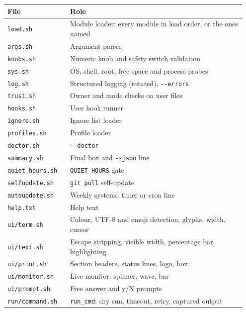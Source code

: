 \documentclass[11pt,a4paper]{article}
\begin{document}
\begin{center}
\begin{longtable}{@{}p{0.25\linewidth} p{0.70\linewidth}@{}}
\toprule
\textbf{File} & \textbf{Role} \\
\midrule \endhead
\texttt{load.sh}                  & Module loader: every module in load order, or the ones named \\
\texttt{args.sh}                  & Argument parser \\
\texttt{knobs.sh}                 & Numeric knob and safety switch validation \\
\texttt{sys.sh}                   & OS, shell, root, free space and process probes \\
\texttt{log.sh}                   & Structured logging (rotated), \texttt{-{}-errors} \\
\texttt{trust.sh}                 & Owner and mode checks on user files \\
\texttt{hooks.sh}                 & User hook runner \\
\texttt{ignore.sh}                & Ignore list loader \\
\texttt{profiles.sh}              & Profile loader \\
\texttt{doctor.sh}                & \texttt{-{}-doctor} \\
\texttt{summary.sh}               & Final box and \texttt{-{}-json} line \\
\texttt{quiet\_hours.sh}           & \texttt{QUIET\_HOURS} gate \\
\texttt{selfupdate.sh}            & \texttt{git pull} self-update \\
\texttt{autoupdate.sh}            & Weekly systemd timer or cron line \\
\texttt{help.txt}                 & Help text \\
\texttt{ui/term.sh}               & Colour, UTF-8 and emoji detection, glyphs, width, cursor \\
\texttt{ui/text.sh}               & Escape stripping, visible width, percentage bar, highlighting \\
\texttt{ui/print.sh}              & Section headers, status lines, logo, box \\
\texttt{ui/monitor.sh}            & Live monitor: spinner, wave, bar \\
\texttt{ui/prompt.sh}             & Free answer and y/N prompts \\
\texttt{run/command.sh}           & \texttt{run\_cmd}: dry run, timeout, retry, captured output \\

\end{longtable}
\end{center}
\end{document}
